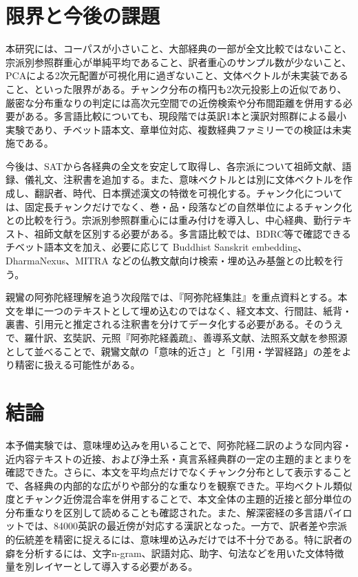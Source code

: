 \documentclass[uplatex,dvipdfmx,11pt,a4paper]{jsarticle}
\begin{document}
\section{限界と今後の課題}

本研究には、コーパスが小さいこと、大部経典の一部が全文比較ではないこと、宗派別参照群重心が単純平均であること、訳者重心のサンプル数が少ないこと、PCAによる2次元配置が可視化用に過ぎないこと、文体ベクトルが未実装であること、といった限界がある。チャンク分布の楕円も2次元投影上の近似であり、厳密な分布重なりの判定には高次元空間での近傍検索や分布間距離を併用する必要がある。多言語比較についても、現段階では英訳1本と漢訳対照群による最小実験であり、チベット語本文、章単位対応、複数経典ファミリーでの検証は未実施である。

今後は、SATから各経典の全文を安定して取得し、各宗派について祖師文献、語録、儀礼文、注釈書を追加する。また、意味ベクトルとは別に文体ベクトルを作成し、翻訳者、時代、日本撰述漢文の特徴を可視化する。チャンク化については、固定長チャンクだけでなく、巻・品・段落などの自然単位によるチャンク化との比較を行う。宗派別参照群重心には重み付けを導入し、中心経典、勤行テキスト、祖師文献を区別する必要がある。多言語比較では、BDRC等で確認できるチベット語本文を加え、必要に応じて Buddhist Sanskrit embedding、DharmaNexus、MITRA などの仏教文献向け検索・埋め込み基盤との比較を行う。

親鸞の阿弥陀経理解を追う次段階では、『阿弥陀経集註』を重点資料とする。本文を単に一つのテキストとして埋め込むのではなく、経文本文、行間註、紙背・裏書、引用元と推定される注釈書を分けてデータ化する必要がある。そのうえで、羅什訳、玄奘訳、元照『阿弥陀経義疏』、善導系文献、法照系文献を参照源として並べることで、親鸞文献の「意味的近さ」と「引用・学習経路」の差をより精密に扱える可能性がある。

\section{結論}

本予備実験では、意味埋め込みを用いることで、阿弥陀経二訳のような同内容・近内容テキストの近接、および浄土系・真言系経典群の一定の主題的まとまりを確認できた。さらに、本文を平均点だけでなくチャンク分布として表示することで、各経典の内部的な広がりや部分的な重なりを観察できた。平均ベクトル類似度とチャンク近傍混合率を併用することで、本文全体の主題的近接と部分単位の分布重なりを区別して読めることも確認された。また、解深密経の多言語パイロットでは、84000英訳の最近傍が対応する漢訳となった。一方で、訳者差や宗派的伝統差を精密に捉えるには、意味埋め込みだけでは不十分である。特に訳者の癖を分析するには、文字n-gram、訳語対応、助字、句法などを用いた文体特徴量を別レイヤーとして導入する必要がある。
\end{document}
